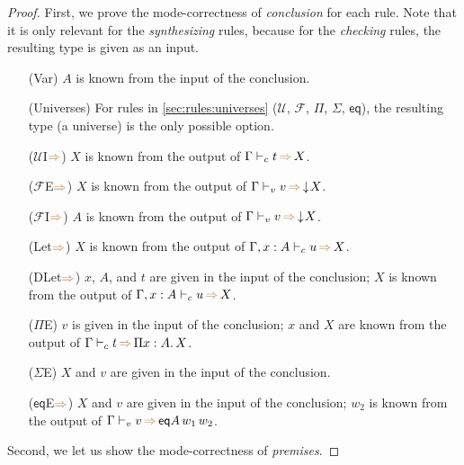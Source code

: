 \documentclass[a4,natbib=false]{article}
\newcommand{\ctov}{\mathcal{U}}
\newcommand{\vtoc}{\mathcal{F}}
\newcommand{\comptoval}[1]{\downarrow \hspace{-2pt} #1}
\newcommand{\pitype}[2]{\Pi {#1}.\,#2}
\newcommand{\eqtype}[3]{\mathsf{eq}{#1}\,{#2}\,{#3}}
\newcommand{\infers}{{\color{brown} \Rightarrow}}
\newcommand{\judgecInfer}[3]{{#1} \vdash_{c} {#2} \, \infers \, {#3}}
\newcommand{\judgevInfer}[3]{{#1} \vdash_{v} {#2} \, \infers \, {#3}}
\begin{document}
\begin{proof}
  First, we prove the mode-correctness of \emph{conclusion} for each rule.
  Note that it is only relevant for the \emph{synthesizing} rules, because for the \emph{checking} rules, the resulting type is given as an input.

  \begin{multicols}{2}
  \begin{itemize}
  \item[(Var)]
    $A$ is known from the input of the conclusion.
  \item[(Universes)]
    For rules in \cref{sec:rules:universes} ($\ctov$, $\vtoc$, $\Pi$,
    $\Sigma$, $\mathsf{eq}$), the resulting type (a universe) is the only
    possible option.

  \item[($\ctov$I$\infers$)]
    $X$ is known from the output of $\judgecInfer{\Gamma}{t}{X}$.

  \item[($\vtoc$E$\infers$)]
    $X$ is known from the output of $\judgevInfer{\Gamma}{v}{\comptoval{X}}$.

  \item[($\vtoc$I$\infers$)]
    $A$ is known from the output of $\judgevInfer{\Gamma}{v}{\comptoval{X}}$.

  \item[(Let$\infers$)]
    $X$ is known from the output of $\judgecInfer{\Gamma, x : A}{u}{X}$.

  \item[(DLet$\infers$)]
    $x$, $A$, and $t$ are given in the input of the conclusion; $X$ is known
    from the output of $\judgecInfer{\Gamma, x:A}{u}{X}$.

  \item[($\Pi$E)]
    $v$ is given in the input of the conclusion; $x$ and $X$ are known from the
    output of $\judgecInfer{\Gamma}{t}{\pitype{x:A}{X}}$.

  \item[($\Sigma$E)]
    $X$ and $v$ are given in the input of the conclusion.

  \item[($\mathsf{eq}$E$\infers$)]
    $X$ and $v$ are given in the input of the conclusion;
    $w_2$ is known from the output of $\judgevInfer{\Gamma}{v}{\eqtype{A}{w_1}{w_2}}$.
  \end{itemize}
  \end{multicols}

  Second, we let us show the mode-correctness of \emph{premises}.
  

\end{proof}
\end{document}
